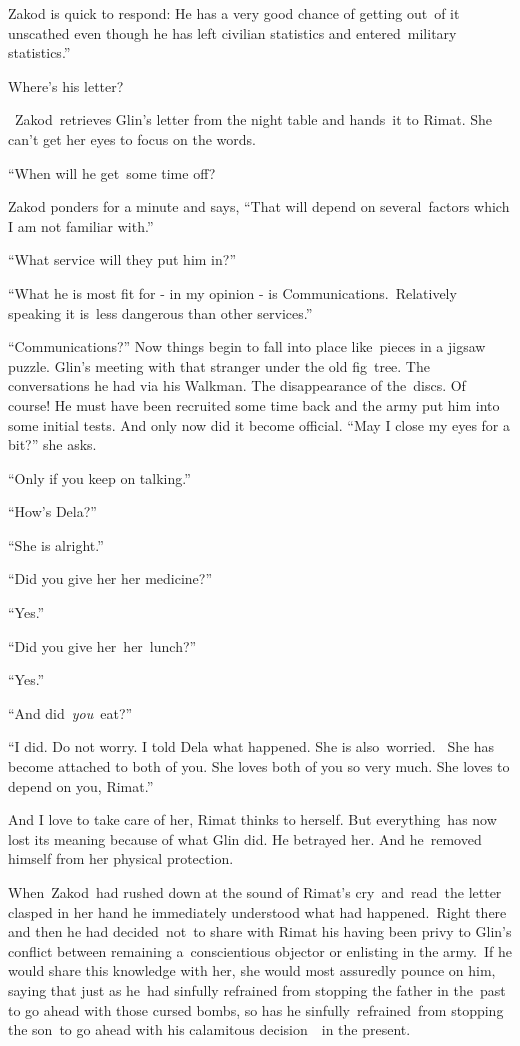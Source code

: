 \documentclass[twoside,11pt]{book}
\begin{document}
Zakod is quick to respond: {\textquotedbl}He has a very good chance of getting out\ of it unscathed even though he has
left civilian statistics and entered\ military statistics.''\ 

{\textquotedbl}Where{}'s his letter?{\textquotedbl} 

~Zakod~retrieves Glin{}'s letter from the night table and hands\ it to Rimat. She can{}'t get her eyes to focus on the
words. 

 ``When will he get~some time off?{\textquotedbl}

Zakod ponders for a minute and says, ``That will depend on several\ factors which I am not familiar with.'' 

{}``What service will they put him in?{}''

{}``What he is most fit for - in my opinion - is Communications.\ Relatively speaking it is~less dangerous than other
services.''\ 

{}``Communications?'' Now things begin to fall into place like\ pieces in a jigsaw puzzle. Glin's meeting with that
stranger under the old fig\ tree. The conversations he had via his Walkman. The disappearance of the\ discs. Of course!
He must have been recruited some time back and the army put him into some initial tests. And only now did it become
official. ``May I close my eyes for a bit?'' she asks.\ 

{}``Only if you keep on talking.''\ 

{}``How{}'s Dela?''\ 

{}``She is alright.''\ 

{}``Did you give her her medicine?''\ 

{}``Yes.''\ 

{}``Did you give her{\ }her\ lunch?''\ 

{}``Yes.''\ 

{}``And did\ \textit{you}\ eat?''\ 

{}``I did. Do not worry. I told Dela what happened. She is also\ worried.~ She has become attached to both of you. She
loves both of you so very much. She loves to depend on you, Rimat.{}''

And I love to take care of her, Rimat thinks to herself. But everything\ has now lost its meaning because of what Glin
did. He betrayed her. And he\ removed himself from her physical protection.

When{\ }Zakod\ had rushed down at the sound of Rimat{}'s cry\ and\ read\ the letter clasped in her hand
he immediately understood what had happened.\ Right there and then he had decided{\ }not\ to share with
Rimat his having been privy to Glin{}'s conflict between remaining a~conscientious objector or enlisting in the
army.\ If he would share this knowledge with her, she would most assuredly pounce on him, saying that just as he\ had
sinfully refrained from stopping the father in the\ past to go ahead with those cursed bombs, so has he
sinfully\ refrained\ from stopping the son\ to go ahead with his calamitous decision\ \ in the present. 
\end{document}
